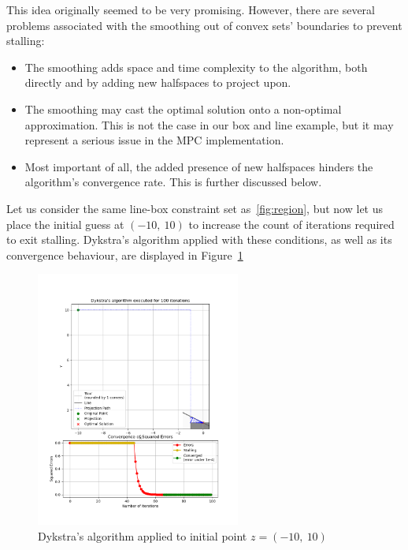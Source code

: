 \documentclass[hidelinks]{article}
\begin{document}
%
\par This idea originally seemed to be very promising. However, there are several problems associated with the smoothing out of convex sets' boundaries to prevent stalling:
%
\begin{itemize}
    \item The smoothing adds space and time complexity to the algorithm, both directly and by adding new halfspaces to project upon.
    \item The smoothing may cast the optimal solution onto a non-optimal approximation. This is not the case in our box and line example, but it may represent a serious issue in the MPC implementation.
    \item Most important of all, the added presence of new halfspaces hinders the algorithm's convergence rate. This is further discussed  below.
\end{itemize}
%
Let us consider the same line-box constraint set as~\ref{fig:region}, but now let us place the initial guess at $(-10,~10)$ to increase the count of iterations required to exit stalling. Dykstra's algorithm applied with these conditions, as well as its convergence behaviour, are displayed in Figure~\ref{fig:oneCorner}
%
\begin{figure}[h!]
    \centering
    
    \includegraphics[width=0.6\textwidth]{Latex/Current Version/Figures/one_corner_rounding.png}
    \caption{Dykstra's algorithm applied to initial point $z = (-10,~10)$}
    \label{fig:oneCorner}

\end{figure}
%
\newpage
\end{document}
